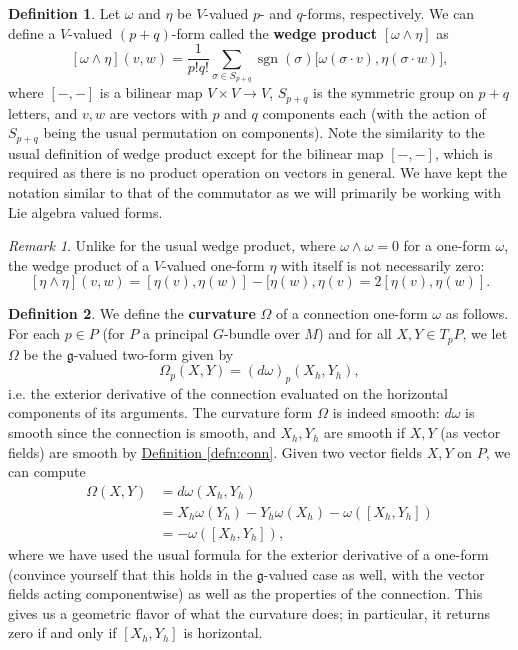 \documentclass{book}
\newcommand{\fr}{\mathfrak}
\DeclareMathOperator{\sgn}{sgn}
\theoremstyle{plain}
\theoremstyle{definition}
\newtheorem{defn}{Definition}
\theoremstyle{remark}
\newtheorem*{rmk}{Remark}
\begin{document}
\begin{defn}
    \label{defn:wedge}
    Let $\omega$ and $\eta$ be $V$-valued $p$- and $q$-forms, respectively. We can define a $V$-valued $(p+q)$-form
    called the \textbf{wedge product} $[\omega\wedge\eta]$ as
    \[ [\omega\wedge\eta](v,w)=\frac{1}{p!q!}\sum_{\sigma\in S_{p+q}}\sgn(\sigma)\big[\omega(\sigma\cdot v),\eta(\sigma\cdot w)\big],\]
    where $[-,-]$ is a bilinear map $V\times V\to V$, $S_{p+q}$ is the symmetric group on $p+q$ letters,
    and $v,w$ are vectors with $p$ and $q$ components each (with the action of $S_{p+q}$ being the usual permutation on components).
    Note the similarity to the usual definition of wedge product except for the bilinear map $[-,-]$, which
    is required as there is no product operation on vectors in general. We have kept the notation similar to
    that of the commutator as we will primarily be working with Lie algebra valued forms.
\end{defn}

\begin{rmk}
    Unlike for the usual wedge product, where $\omega\wedge\omega=0$ for a one-form $\omega$, the wedge product of a
    $V$-valued one-form $\eta$ with itself is not necessarily zero:
    \[ [\eta\wedge\eta](v,w)=[\eta(v),\eta(w)]-[\eta(w),\eta(v)=2[\eta(v),\eta(w)].\]
\end{rmk}

\begin{defn}
We define the \textbf{curvature} $\Omega$ of a connection one-form $\omega$ as follows. For each $p\in P$ (for $P$ a principal $G$-bundle over $M$) and for all $X,Y\in T_pP$, we let $\Omega$ be the $\fr g$-valued two-form given by
\[\Omega_p(X,Y)=(d\omega)_p(X_h,Y_h),\]
i.e. the exterior derivative of the connection evaluated on the horizontal components of its arguments. The curvature form $\Omega$
is indeed smooth: $d\omega$ is smooth since the connection is smooth, and $X_h,Y_h$ are smooth if $X,Y$ (as vector fields) are smooth
by \hyperref[defn:conn]{Definition \ref*{defn:conn}}. Given two vector fields $X,Y$ on $P$, we can compute
\begin{align*}
    \Omega(X,Y)&=d\omega(X_h,Y_h)\\
    &=X_h\omega(Y_h)-Y_h\omega(X_h)-\omega([X_h,Y_h])\\
    &=-\omega([X_h,Y_h]),
\end{align*}
where we have used the usual formula for the exterior derivative of a one-form (convince yourself that this holds in the $\fr g$-valued
case as well, with the vector fields acting componentwise) as well as the properties of the connection. This gives us a geometric flavor
of what the curvature does; in particular, it returns zero if and only if $[X_h,Y_h]$ is horizontal.
\end{defn}
\end{document}
